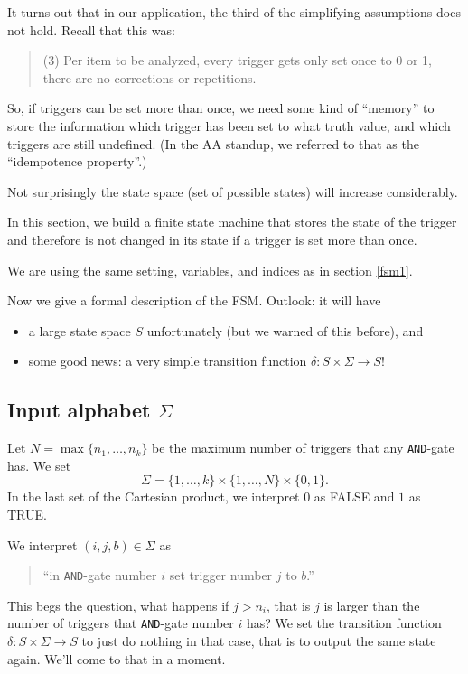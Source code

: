 \documentclass[12pt]{amsart}
\begin{document}
It turns out that in our application, the third of the simplifying 
assumptions does not hold. Recall that this was:
\begin{quote}
    (3) Per item to be analyzed, every trigger gets only set
        once to 0 or 1, there are no corrections or repetitions.
\end{quote}

So, if triggers can be set more than once, we need some kind 
of ``memory'' to store the information which trigger has been set
to what truth value, and which triggers are still undefined. (In the
AA standup, we referred to that as the ``idempotence property''.)

Not surprisingly the state space (set of possible states) will increase
considerably.

In this section, we build a finite state machine that stores the state
of the trigger and therefore is not changed in its state if 
a trigger is set more than once. 

We are using the same setting, 
variables, and indices as in section \ref{fsm1}.

Now we give a formal description of the FSM. Outlook: it will have 
\begin{itemize}
    \item a large state space $S$ unfortunately (but we warned of this before), and
    \item some good news: a very simple transition 
        function $\delta:S\times \Sigma \to S$!
\end{itemize}

\subsection{Input alphabet $\Sigma$} Let $N = \max\{n_1, \ldots, n_k\}$ 
be the maximum number of triggers that any {\tt AND}-gate has. 
We set $$\Sigma = \{1,\ldots, k\}\times\{1,\ldots,N\} \times \{0,1\}.$$
In the last set of the Cartesian product, we interpret $0$ as FALSE and $1$ 
as TRUE.

We interpret $(i,j,b)\in \Sigma$ as \begin{quote}
    ``in {\tt AND}-gate number $i$ set trigger number $j$ to $b$.''
\end{quote}
This begs the question, what happens if $j>n_i$, that is $j$ is larger than 
the number of triggers that {\tt AND}-gate number $i$ has? We set the transition
function $\delta:S\times \Sigma\to S$ to just do nothing in that case, that is to 
output the same state again. We'll come to that in a moment.
\end{document}
